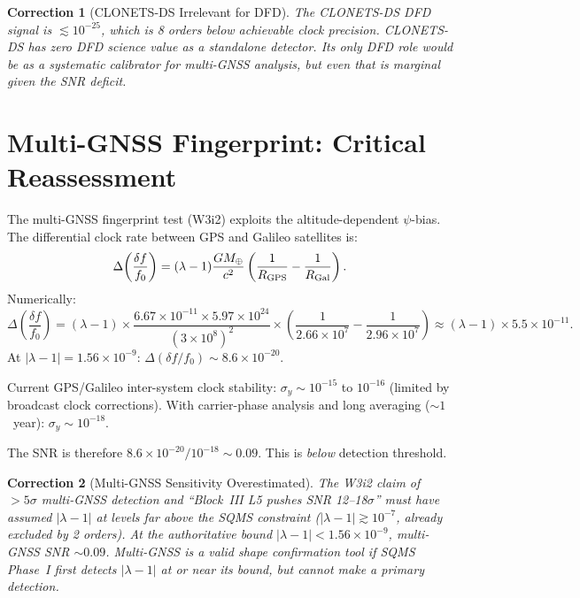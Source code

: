 \documentclass[11pt]{article}
\newtheorem{correction}{Correction}
\newcommand{\ee}[1]{\times 10^{#1}}
\begin{document}
\begin{correction}[CLONETS-DS Irrelevant for DFD]\label{corr:clonets}
The CLONETS-DS DFD signal is $\lesssim 10^{-25}$, which is 8 orders
below achievable clock precision. CLONETS-DS has zero DFD science
value as a standalone detector. Its only DFD role would be as a
systematic calibrator for multi-GNSS analysis, but even that is
marginal given the SNR deficit.
\end{correction}

\section{Multi-GNSS Fingerprint: Critical Reassessment}

The multi-GNSS fingerprint test (W3i2) exploits the altitude-dependent
$\psi$-bias. The differential clock rate between GPS and Galileo
satellites is:
\begin{equation}
\Delta\!\left(\frac{\delta f}{f_0}\right) = (\lambda - 1)
\frac{GM_\oplus}{c^2}\left(\frac{1}{R_{\rm GPS}} - \frac{1}{R_{\rm Gal}}\right).
\end{equation}
Numerically:
\begin{equation}
\Delta\!\left(\frac{\delta f}{f_0}\right) = (\lambda-1) \times
\frac{6.67\ee{-11} \times 5.97\ee{24}}{(3\ee{8})^2}
\times \left(\frac{1}{2.66\ee{7}} - \frac{1}{2.96\ee{7}}\right)
\approx (\lambda-1) \times 5.5\ee{-11}.
\end{equation}
At $|\lambda-1| = 1.56\ee{-9}$: $\Delta(\delta f/f_0) \sim 8.6\ee{-20}$.

Current GPS/Galileo inter-system clock stability: $\sigma_y \sim 10^{-15}$
to $10^{-16}$ (limited by broadcast clock corrections). With carrier-phase
analysis and long averaging ($\sim 1$~year): $\sigma_y \sim 10^{-18}$.

The SNR is therefore $8.6\ee{-20} / 10^{-18} \sim 0.09$. This is
\emph{below} detection threshold.

\begin{correction}[Multi-GNSS Sensitivity Overestimated]\label{corr:gnss}
The W3i2 claim of $>5\sigma$ multi-GNSS detection and ``Block~III L5
pushes SNR 12--18$\sigma$'' must have assumed $|\lambda-1|$ at levels
far above the SQMS constraint ($|\lambda-1| \gtrsim 10^{-7}$, already
excluded by 2 orders). At the authoritative bound $|\lambda-1| < 1.56\ee{-9}$,
multi-GNSS SNR $\sim 0.09$. Multi-GNSS is a valid \emph{shape
confirmation} tool if SQMS Phase~I first detects $|\lambda-1|$ at
or near its bound, but cannot make a primary detection.
\end{correction}
\end{document}
